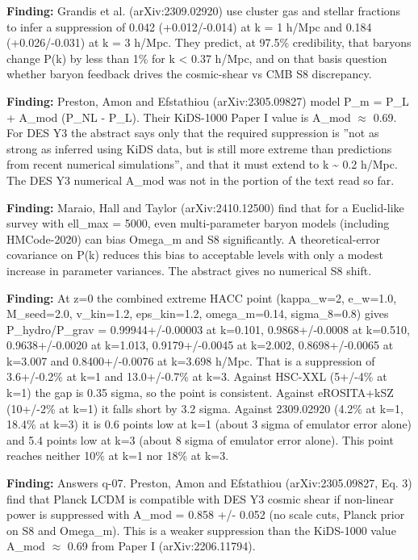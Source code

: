 \documentclass[11pt,a4paper]{article}
\begin{document}
\textbf{Finding:} Grandis et al. (arXiv:2309.02920) use cluster gas and stellar fractions to infer a suppression of 0.042 (+0.012/-0.014) at k = 1 h/Mpc and 0.184 (+0.026/-0.031) at k = 3 h/Mpc. They predict, at 97.5\% credibility, that baryons change P(k) by less than 1\% for k \textless{} 0.37 h/Mpc, and on that basis question whether baryon feedback drives the cosmic-shear vs CMB S8 discrepancy.

\textbf{Finding:} Preston, Amon and Efstathiou (arXiv:2305.09827) model P\_m = P\_L + A\_mod (P\_NL - P\_L). Their KiDS-1000 Paper I value is A\_mod $\approx$ 0.69. For DES Y3 the abstract says only that the required suppression is ''not as strong as inferred using KiDS data, but is still more extreme than predictions from recent numerical simulations'', and that it must extend to k \textasciitilde{} 0.2 h/Mpc. The DES Y3 numerical A\_mod was not in the portion of the text read so far.

\textbf{Finding:} Maraio, Hall and Taylor (arXiv:2410.12500) find that for a Euclid-like survey with ell\_max = 5000, even multi-parameter baryon models (including HMCode-2020) can bias Omega\_m and S8 significantly. A theoretical-error covariance on P(k) reduces this bias to acceptable levels with only a modest increase in parameter variances. The abstract gives no numerical S8 shift.

\textbf{Finding:} At z=0 the combined extreme HACC point (kappa\_w=2, e\_w=1.0, M\_seed=2.0, v\_kin=1.2, eps\_kin=1.2, omega\_m=0.14, sigma\_8=0.8) gives P\_hydro/P\_grav = 0.99944+/-0.00003 at k=0.101, 0.9868+/-0.0008 at k=0.510, 0.9638+/-0.0020 at k=1.013, 0.9179+/-0.0045 at k=2.002, 0.8698+/-0.0065 at k=3.007 and 0.8400+/-0.0076 at k=3.698 h/Mpc. That is a suppression of 3.6+/-0.2\% at k=1 and 13.0+/-0.7\% at k=3. Against HSC-XXL (5+/-4\% at k=1) the gap is 0.35 sigma, so the point is consistent. Against eROSITA+kSZ (10+/-2\% at k=1) it falls short by 3.2 sigma. Against 2309.02920 (4.2\% at k=1, 18.4\% at k=3) it is 0.6 points low at k=1 (about 3 sigma of emulator error alone) and 5.4 points low at k=3 (about 8 sigma of emulator error alone). This point reaches neither 10\% at k=1 nor 18\% at k=3.

\textbf{Finding:} Answers q-07. Preston, Amon and Efstathiou (arXiv:2305.09827, Eq. 3) find that Planck LCDM is compatible with DES Y3 cosmic shear if non-linear power is suppressed with A\_mod = 0.858 +/- 0.052 (no scale cuts, Planck prior on S8 and Omega\_m). This is a weaker suppression than the KiDS-1000 value A\_mod $\approx$ 0.69 from Paper I (arXiv:2206.11794).
\end{document}
